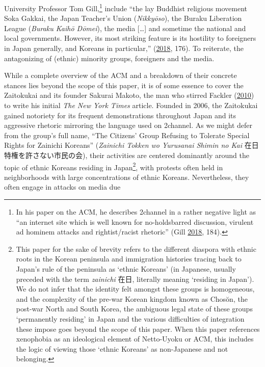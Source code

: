 \documentclass[10pt,british,A4paper,,openany]{memoir}
\begin{document}
University Professor Tom Gill,\footnote{In his paper on the ACM, he
  describes 2channel in a rather negative light as ``an internet site
  which is well known for no-holdsbarred discussion, virulent ad hominem
  attacks and rightist/racist rhetoric'' (Gill
  \protect\hyperlink{ref-gill_nativist_2018}{2018}, 184).} include ``the
lay Buddhist religious movement Soka Gakkai, the Japan Teacher's Union
(\emph{Nikkyōso}), the Buraku Liberation League (\emph{Buraku Kaihō
Dōmei}), the media {[}\ldots{}{]} and sometime the national and local
governments. However, its most striking feature is its hostility to
foreigners in Japan generally, and Koreans in particular,''
(\protect\hyperlink{ref-gill_nativist_2018}{2018}, 176). To reiterate,
the antagonizing of (ethnic) minority groups, foreigners and the media.

While a complete overview of the ACM and a breakdown of their concrete
stances lies beyond the scope of this paper, it is of some essence to
cover the Zaitokukai and its founder Sakurai Makoto, the man who stirred
Fackler (\protect\hyperlink{ref-fackler_new_2010-1}{2010}) to write his
initial \emph{The New York Times} article. Founded in 2006, the
Zaitokukai gained notoriety for its frequent demonstrations throughout
Japan and its aggressive rhetoric mirroring the language used on
2channel. As we might defer from the group's full name, ``The Citizens'
Group Refusing to Tolerate Special Rights for Zainichi Koreans''
(\emph{Zainichi Tokken wo Yurusanai Shimin no Kai}
在日特権を許さない市民の会), their activities are centered dominantly
around the topic of ethnic Koreans residing in Japan\footnote{This paper
  for the sake of brevity refers to the different diaspora with ethnic
  roots in the Korean peninsula and immigration histories tracing back
  to Japan's rule of the peninsula as `ethnic Koreans' (in Japanese,
  usually preceded with the term \emph{zainichi} 在日, literally meaning
  `residing in Japan'). We do not infer that the identity felt amongst
  these groups is homogeneous, and the complexity of the pre-war Korean
  kingdom known as Chosŏn, the post-war North and South Korea, the
  ambiguous legal state of these groups `permanently residing' in Japan
  and the various difficulties of integration these impose goes beyond
  the scope of this paper. When this paper references xenophobia as an
  ideological element of Netto-Uyoku or ACM, this includes the logic of
  viewing those `ethnic Koreans' as non-Japanese and not belonging.},
with protests often held in neighborhoods with large concentrations of
ethnic Koreans. Nevertheless, they often engage in attacks on media due
\end{document}
